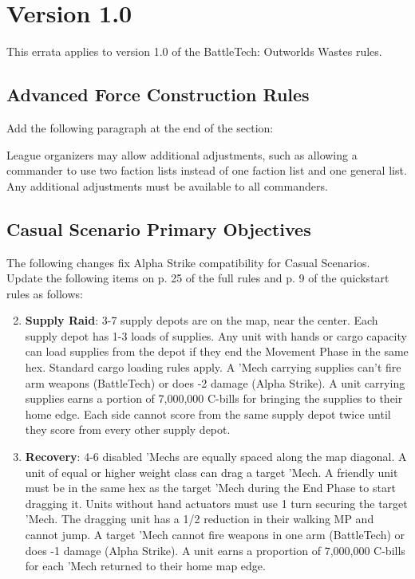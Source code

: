 \section{Version 1.0}

This errata applies to version 1.0 of the BattleTech: Outworlds Wastes rules.

\subsection{Advanced Force Construction Rules}

Add the following paragraph at the end of the section:

League organizers may allow additional adjustments, such as allowing a commander to use two faction lists instead of one faction list and one general list.
Any additional adjustments must be available to all commanders.

\subsection{Casual Scenario Primary Objectives}

The following changes fix Alpha Strike compatibility for Casual Scenarios.
Update the following items on p. 25 of the full rules and p. 9 of the quickstart rules  as follows:

\begin{enumerate}

\setcounter{enumi}{1}
\item {\bfseries Supply Raid}: 3-7 supply depots are on the map, near the center.
Each supply depot has 1-3 loads of supplies.
Any unit with hands or cargo capacity can load supplies from the depot if they end the Movement Phase in the same hex.
Standard cargo loading rules apply.
A 'Mech carrying supplies can't fire arm weapons (BattleTech) or does -2 damage (Alpha Strike).
A unit carrying supplies earns a portion of 7,000,000 C-bills for bringing the supplies to their home edge.
Each side cannot score from the same supply depot twice until they score from every other supply depot.

\setcounter{enumi}{7}
\item {\bfseries Recovery}: 4-6 disabled 'Mechs are equally spaced along the map diagonal.
A unit of equal or higher weight class can drag a target 'Mech.
A friendly unit must be in the same hex as the target 'Mech during the End Phase to start dragging it.
Units without hand actuators must use 1 turn securing the target 'Mech.
The dragging unit has a 1/2 reduction in their walking MP and cannot jump.
A target 'Mech cannot fire weapons in one arm (BattleTech) or does -1 damage (Alpha Strike).
A unit earns a proportion of 7,000,000 C-bills for each 'Mech returned to their home map edge.

\end{enumerate}


